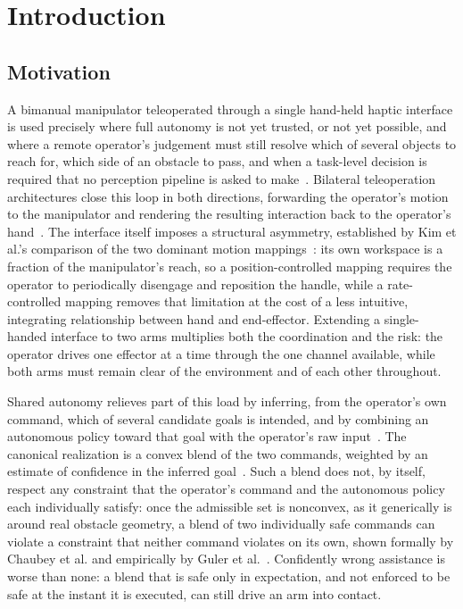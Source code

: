 \documentclass[12pt,a4paper,twoside,openright]{report}
\begin{document}
\tableofcontents
\listoffigures
\listoftables
\clearpage

\chapter{Introduction}
\label{ch:intro}

\section{Motivation}
\label{sec:motivation}

A bimanual manipulator teleoperated through a single hand-held haptic interface is used precisely where full autonomy is not yet trusted, or not yet possible, and where a remote operator's judgement must still resolve which of several objects to reach for, which side of an obstacle to pass, and when a task-level decision is required that no perception pipeline is asked to make~\cite{jain2020probabilistic}. Bilateral teleoperation architectures close this loop in both directions, forwarding the operator's motion to the manipulator and rendering the resulting interaction back to the operator's hand~\cite{hokayem2006bilateral}. The interface itself imposes a structural asymmetry, established by Kim et al.'s comparison of the two dominant motion mappings~\cite{kim1987comparison}: its own workspace is a fraction of the manipulator's reach, so a position-controlled mapping requires the operator to periodically disengage and reposition the handle, while a rate-controlled mapping removes that limitation at the cost of a less intuitive, integrating relationship between hand and end-effector. Extending a single-handed interface to two arms multiplies both the coordination and the risk: the operator drives one effector at a time through the one channel available, while both arms must remain clear of the environment and of each other throughout.

Shared autonomy relieves part of this load by inferring, from the operator's own command, which of several candidate goals is intended, and by combining an autonomous policy toward that goal with the operator's raw input~\cite{selvaggio2021autonomy,losey2018review}. The canonical realization is a convex blend of the two commands, weighted by an estimate of confidence in the inferred goal~\cite{dragan2013policy}. Such a blend does not, by itself, respect any constraint that the operator's command and the autonomous policy each individually satisfy: once the admissible set is nonconvex, as it generically is around real obstacle geometry, a blend of two individually safe commands can violate a constraint that neither command violates on its own, shown formally by Chaubey et al. and empirically by Guler et al.~\cite{chaubey2026minimalintervention,guler2026barrierik}. Confidently wrong assistance is worse than none: a blend that is safe only in expectation, and not enforced to be safe at the instant it is executed, can still drive an arm into contact.
\end{document}
